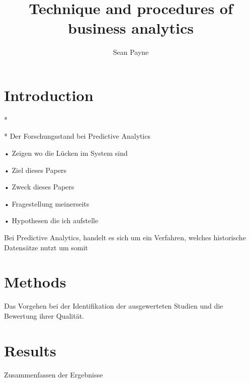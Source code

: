 \documentclass[12pt,twocolumn,twoside]{conference}   %
\title{Technique and procedures of business analytics}
\author{Sean Payne}
\begin{document}

\section{Introduction}
\begin{list}{•}
\item[*] 
\item[*] Der Forschungsstand bei Predictive Analytics
\item[•] Zeigen wo die Lücken im System sind
\item[•] Ziel dieses Papers
\item[•] Zweck dieses Papers
\item[•] Fragestellung meinerseits
\item[•] Hypothesen die ich aufstelle
\end{list}

Bei Predictive Analytics, handelt es sich um ein Verfahren, welches historische Datensätze nutzt um somit 


\section{Methods}
\begin{list}{•}
\item Das Vorgehen bei der Identifikation der ausgewerteten Studien und die Bewertung ihrer Qualität.
\end{list}


\section{Results}
\begin{list}{•}
\item Zusammenfassen der Ergebnisse
\end{list}
\end{document}
